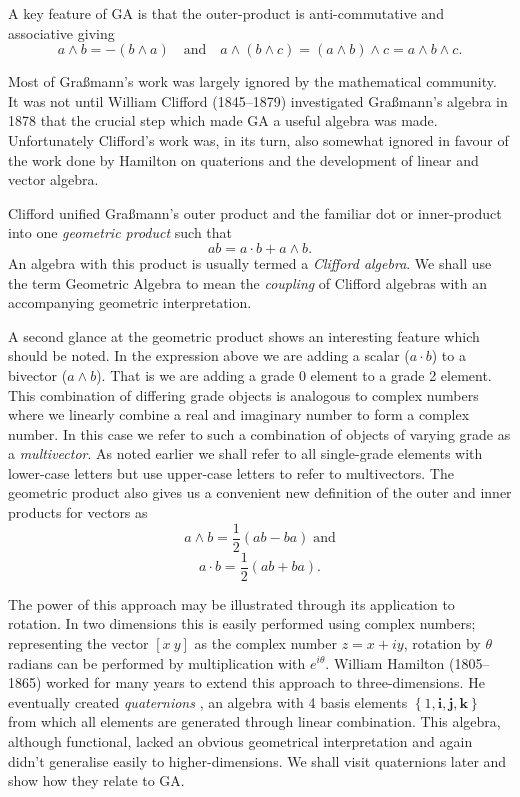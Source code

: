 A key feature of GA is that the outer-product is anti-commutative and
associative giving
\begin{displaymath}
a \wedge b = - ( b \wedge a)\quad\mbox{and}\quad
a \wedge (b \wedge c) = (a \wedge b) \wedge c = a \wedge b \wedge c.
\end{displaymath}

Most of Gra{\ss}mann's work was largely ignored by the mathematical community.
It was not until William Clifford (1845--1879) investigated Gra{\ss}mann's
algebra in 1878\cite{GA:clifford} that the crucial step which made GA a useful
algebra was made. Unfortunately Clifford's work was, in its turn, also
somewhat ignored in favour of the work done by Hamilton on quaterions and
the development of linear and vector algebra.

Clifford unified Gra{\ss}mann's outer product and the familiar dot
or inner-product into one \emph{geometric product} such that
\begin{displaymath}
ab = a\cdot b + a \wedge b.
\end{displaymath}
An algebra with this product is usually termed a \emph{Clifford algebra}. We
shall use the term Geometric Algebra to mean the \emph{coupling} of Clifford
algebras with an accompanying geometric interpretation.

A second glance at the geometric product shows an interesting feature which
should be noted. In the expression above we are adding a scalar ($a \cdot b$)
to a bivector ($a \wedge b$). That is we are adding a grade 0 element to a
grade 2 element. This combination of differing grade objects is analogous to
complex numbers where we linearly combine a real and imaginary number to form
a complex number. In this case we refer to such a combination of objects of
varying grade as a \emph{multivector}.  As noted earlier we shall refer to all
single-grade elements with lower-case letters but use upper-case letters to
refer to multivectors. The geometric product also gives us a convenient new
definition of the outer and inner products for vectors as
\[
a \wedge b = \frac{1}{2}(ab - ba)\;\mbox{and}
\]
\[
a \cdot b = \frac{1}{2}(ab + ba).
\]

The power of this approach may be illustrated through its application to
rotation. In two dimensions this is easily performed using complex numbers;
representing the vector $[x\ y]$ as the complex number $z = x + iy$, rotation
by $\theta$ radians can be performed by multiplication with $e^{i\theta}$.
William Hamilton (1805--1865) worked for many years to extend this approach to
three-dimensions. He eventually created \emph{quaternions}
\cite{hamilton2,hamilton1}, an algebra with 4 basis elements $\left\{1,
\mathbf{i}, \mathbf{j}, \mathbf{k}\right\}$ from which all elements are
generated through linear combination. This algebra, although functional,
lacked an obvious geometrical interpretation and again didn't generalise
easily to higher-dimensions. We shall visit quaternions later and show how they relate to GA.

